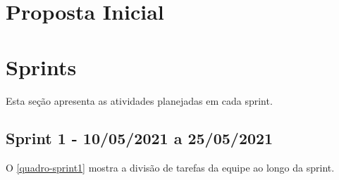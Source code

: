 
\begin{apendicesenv}

\partapendices
\chapter{Proposta Inicial}


\chapter{Sprints}
\label{sprints-atividades}

Esta seção apresenta as atividades planejadas em cada \gls{sprint}.


\section{Sprint 1 - 10/05/2021 a 25/05/2021}

O \autoref{quadro-sprint1} mostra a divisão de tarefas da equipe ao longo da sprint.


\end{apendicesenv}
